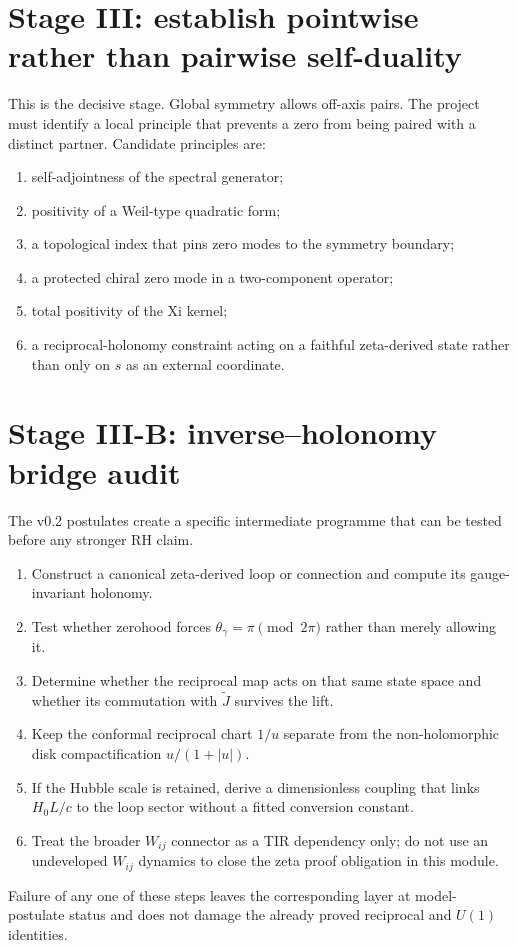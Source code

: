 \section{Stage III: establish pointwise rather than pairwise self-duality}
This is the decisive stage. Global symmetry allows off-axis pairs. The project must identify a local principle that prevents a zero from being paired with a distinct partner. Candidate principles are:
\begin{enumerate}
\item self-adjointness of the spectral generator;
\item positivity of a Weil-type quadratic form;
\item a topological index that pins zero modes to the symmetry boundary;
\item a protected chiral zero mode in a two-component operator;
\item total positivity of the Xi kernel;
\item a reciprocal-holonomy constraint acting on a faithful zeta-derived state rather than only on $s$ as an external coordinate.
\end{enumerate}

\section{Stage III-B: inverse--holonomy bridge audit}
The v0.2 postulates create a specific intermediate programme that can be tested before any stronger RH claim.
\begin{enumerate}
\item Construct a canonical zeta-derived loop or connection and compute its gauge-invariant holonomy.
\item Test whether zerohood forces $\theta_\gamma=\pi\pmod{2\pi}$ rather than merely allowing it.
\item Determine whether the reciprocal map acts on that same state space and whether its commutation with $\widetilde J$ survives the lift.
\item Keep the conformal reciprocal chart $1/u$ separate from the non-holomorphic disk compactification $u/(1+|u|)$.
\item If the Hubble scale is retained, derive a dimensionless coupling that links $H_0L/c$ to the loop sector without a fitted conversion constant.
\item Treat the broader $W_{ij}$ connector as a TIR dependency only; do not use an undeveloped $W_{ij}$ dynamics to close the zeta proof obligation in this module.
\end{enumerate}
Failure of any one of these steps leaves the corresponding layer at model-postulate status and does not damage the already proved reciprocal and $U(1)$ identities.

